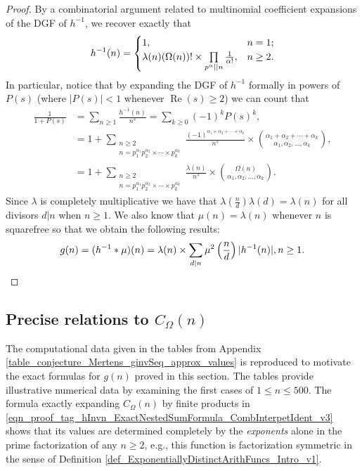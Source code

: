 \documentclass[11pt,reqno,a4letter]{article}
\newcommand{\hlocalref}[1]{\hyperref[#1]{\ref{#1}}}
\numberwithin{equation}{section}
\numberwithin{figure}{section}
\numberwithin{table}{section}
\newcommand{\cf}{\textit{cf.\ }}
\theoremstyle{plain}
\numberwithin{theorem}{section}
\theoremstyle{definition}
\renewcommand{\Re}{\operatorname{Re}}
\begin{document}
\begin{proof}
By a combinatorial argument related to multinomial coefficient expansions of the DGF of $h^{-1}$, 
we recover exactly that \cite[\cf \S 2]{FROBERG-1968} 
\begin{equation} 
\notag 
h^{-1}(n) = \begin{cases} 
     1, & n = 1; \\ 
     \lambda(n) (\Omega(n))! \times \prod\limits_{p^{\alpha} || n} \frac{1}{\alpha!}, & n \geq 2. 
     \end{cases}
\end{equation} 
In particular, notice that by expanding the DGF of 
$h^{-1}$ formally in powers of $P(s)$ (where $|P(s)| < 1$ whenever $\Re(s) \geq 2$) 
we can count that 
\begin{align*}
\frac{1}{1+P(s)} & = \sum_{n \geq 1} \frac{h^{-1}(n)}{n^s} = \sum_{k \geq 0} (-1)^k P(s)^k, \\ 
     & = 
     1 + \sum_{\substack{n \geq 2 \\ n =p_1^{\alpha_1}p_2^{\alpha_2} \times \cdots \times p_k^{\alpha_k}}} 
     \frac{(-1)^{\alpha_1+\alpha_2+\cdots+\alpha_k}}{n^s} \times 
     \binom{\alpha_1+\alpha_2+\cdots+\alpha_k}{\alpha_1,\alpha_2,\ldots,\alpha_k}, \\ 
     & = 
     1 + \sum_{\substack{n \geq 2 \\ n =p_1^{\alpha_1}p_2^{\alpha_2} \times \cdots \times p_k^{\alpha_k}}} 
     \frac{\lambda(n)}{n^s} \times \binom{\Omega(n)}{\alpha_1,\alpha_2,\ldots,\alpha_k}. 
\end{align*}
Since $\lambda$ is completely multiplicative we have that 
$\lambda\left(\frac{n}{d}\right) \lambda(d) = \lambda(n)$ for all divisors 
$d|n$ when $n \geq 1$. We also know that $\mu(n) = \lambda(n)$ whenever $n$ is squarefree 
so that we obtain the following results: 
\[
g(n) = (h^{-1} \ast \mu)(n) = \lambda(n) \times \sum_{d|n} \mu^2\left(\frac{n}{d}\right) |h^{-1}(n)|, n \geq 1. 
     \qedhere 
\]
\end{proof} 

\subsection{Precise relations to $C_{\Omega}(n)$} 
\label{Section_InvFunc_PreciseExpsAndAsymptotics} 
\label{subSection_Relating_CknFuncs_to_gInvn} 

The computational data given in the tables from 
Appendix \hlocalref{table_conjecture_Mertens_ginvSeq_approx_values} 
is reproduced to motivate the exact formulas for  
$g(n)$ proved in this section. The tables provide illustrative 
numerical data by examining the first cases of $1 \leq n \leq 500$. 
The formula exactly expanding $C_{\Omega}(n)$ by finite products in 
\eqref{eqn_proof_tag_hInvn_ExactNestedSumFormula_CombInterpetIdent_v3} 
shows that its values are determined completely by the \emph{exponents} alone 
in the prime factorization of any $n \geq 2$, e.g., this function is 
factorization symmetric in the sense of 
Definition \ref{def_ExponentiallyDistinctArithFuncs_Intro_v1}. 
\end{document}
